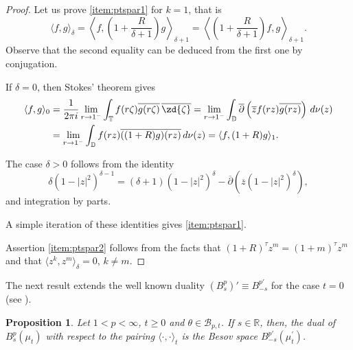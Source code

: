 \documentclass[12pt,twoside,leqno,final]{amsart}
\theoremstyle{plain}
\newtheorem{prop}[thm]{Proposition}
\begin{document}
\begin{proof} 
Let us prove  \eqref{item:ptspar1} for $k=1$, that is 
$$
\langle f,g\rangle_\delta 
= \left\langle f,\left(1+\frac{R}{\delta+1}\right)g\right\rangle_{\delta+1} 
= \left\langle \left(1+\frac{R}{\delta+1}\right)f,g\right\rangle_{\delta+1}. 
$$
Observe that the second equality can be deduced from the first one by conjugation.

If $\delta=0$, then Stokes' theorem gives
\begin{align*}
\langle f,g\rangle_0 &=\frac{1}{2\pi i}\lim_{r\to 1^{-}}\int_{{\mathbb T}} f(r{\zeta})\overline{g(r{\zeta})}\,\overline\zd{\zeta}
=\lim_{r\to 1^{-}}\int_{{\mathbb D}} \overline{\partial}\left(\overline{z} f(rz)\overline{g(rz)}\right)\,d\nu(z)\\
&=\lim_{r\to 1^{-}}\int_{{\mathbb D}}  f(rz)\overline{((1+R)g)(rz)}\,d\nu(z)=\langle f,(1+R)g\rangle_{1}.
\end{align*}

The case $\delta>0$ follows from the identity 
$$
\delta(1-|z|^2)^{\delta-1}
=(\delta+1)(1-|z|^2)^\delta-\overline{\partial}\left(\overline z(1-|z|^2)^\delta\right),
$$ 
and  integration by parts.

A simple iteration of these identities gives \eqref{item:ptspar1}.

Assertion \eqref{item:ptspar2} follows from the facts that $(1+R)^\tau z^m=(1+m)^\tau z^m$ and that 
$\langle z^k,z^m\rangle_\delta=0$, $k\ne m$.
\end{proof}

The next result extends the well known  duality  $(B^p_s)' \equiv B^{p'}_{-s}$ for the  case  $t=0$ (see \cite{Lu}). 
 
 
\begin{prop}\label{prop:dualB}
Let $1<p<\infty$, $t\ge 0$ and $\theta\in {{\mathcal B}}_{p,t}$. If $s\in{{\mathbb R}}$, then, the dual of $B^p_{s}(\mu_t)$ with respect to the pairing $\langle \cdot,\cdot\rangle_t$ is the Besov space  $B^{p'}_{-s}(\mu^\prime_t)$.
\end{prop}
\end{document}
